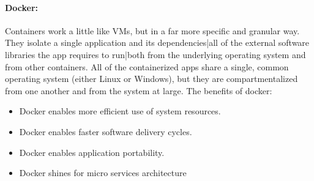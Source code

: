 \paragraph{Docker:} Containers work a little like VMs, but in a far more specific and
granular way. They isolate a single application and its dependencies|all of the
external software libraries the app requires to run|both from the underlying
operating system and from other containers. All of the containerized apps share
a single, common operating system (either Linux or Windows), but they are compartmentalized from one another and from the system at large.
The benefits of docker:
\begin{itemize}
    \item Docker enables more efficient use of system resources.
    \item Docker enables faster software delivery cycles.
    \item Docker enables application portability.
    \item Docker shines for micro services architecture
\end{itemize}

\clearpage